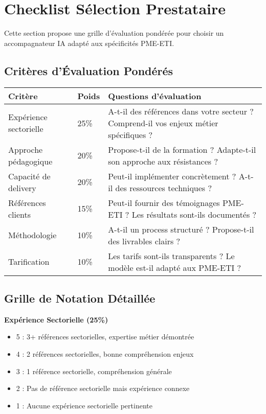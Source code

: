 \section{Checklist Sélection Prestataire}

Cette section propose une grille d'évaluation pondérée pour choisir un accompagnateur IA adapté aux spécificités PME-ETI.

\subsection{Critères d'Évaluation Pondérés}

\begin{longtable}{@{}p{4cm}p{2cm}p{8cm}@{}}
\toprule
\textbf{Critère} & \textbf{Poids} & \textbf{Questions d'évaluation} \\
\midrule
Expérience sectorielle & 25\% & A-t-il des références dans votre secteur ? Comprend-il vos enjeux métier spécifiques ? \\
Approche pédagogique & 20\% & Propose-t-il de la formation ? Adapte-t-il son approche aux résistances ? \\
Capacité de delivery & 20\% & Peut-il implémenter concrètement ? A-t-il des ressources techniques ? \\
Références clients & 15\% & Peut-il fournir des témoignages PME-ETI ? Les résultats sont-ils documentés ? \\
Méthodologie & 10\% & A-t-il un process structuré ? Propose-t-il des livrables clairs ? \\
Tarification & 10\% & Les tarifs sont-ils transparents ? Le modèle est-il adapté aux PME-ETI ? \\
\bottomrule
\end{longtable}

\subsection{Grille de Notation Détaillée}

\textbf{Expérience Sectorielle (25\%)}
\begin{itemize}
    \item 5 : 3+ références sectorielles, expertise métier démontrée
    \item 4 : 2 références sectorielles, bonne compréhension enjeux
    \item 3 : 1 référence sectorielle, compréhension générale
    \item 2 : Pas de référence sectorielle mais expérience connexe
    \item 1 : Aucune expérience sectorielle pertinente
\end{itemize}

